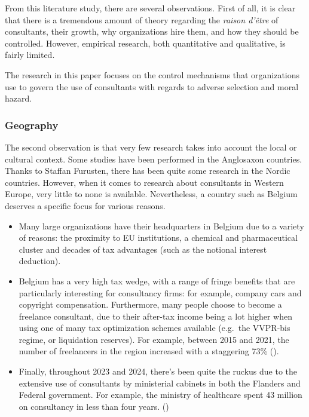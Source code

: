 \documentclass[
  man,floatsintext]{apa6}
\begin{document}
From this literature study, there are several observations. First of all, it is clear that there is a tremendous amount of theory regarding the \emph{raison d'être} of consultants, their growth, why organizations hire them, and how they should be controlled. However, empirical research, both quantitative and qualitative, is fairly limited.

The research in this paper focuses on the control mechanisms that organizations use to govern the use of consultants with regards to adverse selection and moral hazard.

\subsubsection{Geography}\label{geography}

The second observation is that very few research takes into account the local or cultural context. Some studies have been performed in the Anglosaxon countries. Thanks to Staffan Furusten, there has been quite some research in the Nordic countries. However, when it comes to research about consultants in Western Europe, very little to none is available. Nevertheless, a country such as Belgium deserves a specific focus for various reasons.

\begin{itemize}
\item
  Many large organizations have their headquarters in Belgium due to a variety of reasons: the proximity to EU institutions, a chemical and pharmaceutical cluster and decades of tax advantages (such as the notional interest deduction).
\item
  Belgium has a very high tax wedge, with a range of fringe benefits that are particularly interesting for consultancy firms: for example, company cars and copyright compensation. Furthermore, many people choose to become a freelance consultant, due to their after-tax income being a lot higher when using one of many tax optimization schemes available (e.g.~the VVPR-bis regime, or liquidation reserves). For example, between 2015 and 2021, the number of freelancers in the region increased with a staggering 73\% ().
\item
  Finally, throughout 2023 and 2024, there's been quite the ruckus due to the extensive use of consultants by ministerial cabinets in both the Flanders and Federal government. For example, the ministry of healthcare spent 43 million on consultancy in less than four years. ()
\end{itemize}
\end{document}
